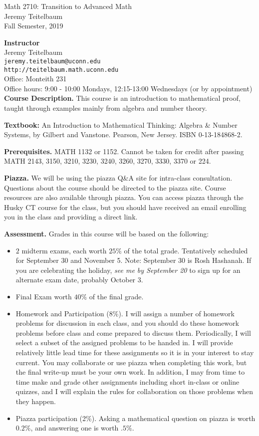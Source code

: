 \documentclass[12pt]{article}
\begin{document}
\begin{center} Math 2710: Transition to Advanced Math \\
Jeremy Teitelbaum \\ Fall Semester, 2019
\end{center}

{\bf Instructor}\\
Jeremy Teitelbaum \\
{\tt jeremy.teitelbaum@uconn.edu} \\
{\tt http://teitelbaum.math.uconn.edu} \\
Office: Monteith 231 \\
Office hours: 9:00 - 10:00 Mondays, 12:15-13:00 Wednesdays (or by appointment) \\


{\bf Course Description.} This course is an introduction to mathematical proof, taught through examples mainly from
algebra and number theory.  

{\bf Textbook:} An Introduction to Mathematical Thinking: Algebra \& Number Systems, by Gilbert and Vanstone. Pearson, New Jersey.
ISBN 0-13-184868-2.

{\bf Prerequisites.} MATH 1132 or 1152. Cannot be taken for credit after passing MATH 2143, 3150, 3210, 3230, 3240, 3260, 3270, 3330, 3370 or 224. 

{\bf Piazza.}  We will be using the piazza Q\&A site for intra-class consultation.  Questions about the course should be directed to the piazza site. Course resources are also available through piazza.  You can access piazza through the Husky CT course for the class, but you should have received an email enrolling you in the class and providing a direct link.

\vfill\eject

{\bf Assessment.}  Grades in this course will be based on the
following:
\begin{itemize}
\item $2$ midterm exams, each worth $25\%$ of the total grade.  Tentatively scheduled for
September 30 and November 5. Note: September 30 is Rosh Hashanah.  If you are celebrating the holiday, \textit{see me by September 20} to sign up for an alternate exam date, probably October 3.
\item Final Exam worth $40\%$ of the final grade.
\item Homework and Participation (8\%).   I will assign a number of homework problems for discussion in each class,
  and you should do these homework problems before class and come prepared to discuss them.  Periodically, I will
  select a subset of the assigned problems to be handed in.  I will provide relatively little lead time for these assignments so it is in your interest to stay current. You may collaborate
or use piazza when completing this work, but the final write-up must be your own work.  In addition, I may from time to time make and grade other assignments including short in-class or online quizzes, and I will explain the rules for collaboration on those problems when they happen.
\item Piazza participation (2\%).  Asking a mathematical question on piazza is worth $0.2\%$,
and answering one is worth $.5\%$.
\end{itemize}
\end{document}
